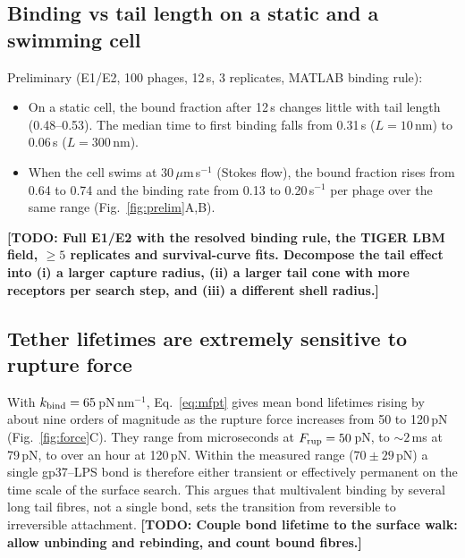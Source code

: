 \documentclass[12pt]{article}
\newcommand{\todo}[1]{{\color{blue}\textbf{[TODO: #1]}}}
\newcommand{\prelim}[1]{{\color{orange!80!black}#1}}
\begin{document}
\subsection*{Binding vs tail length on a static and a swimming cell}
\prelim{Preliminary (E1/E2, 100 phages, 12\,s, 3 replicates, MATLAB binding rule):}
\begin{itemize}\setlength\itemsep{0pt}
\item \prelim{On a static cell, the bound fraction after 12\,s changes little with tail length (0.48--0.53). The median time to first binding falls from 0.31\,s ($L=10$\,nm) to 0.06\,s ($L=300$\,nm).}
\item \prelim{When the cell swims at 30\,$\mu$m\,s$^{-1}$ (Stokes flow), the bound fraction rises from 0.64 to 0.74 and the binding rate from 0.13 to 0.20\,s$^{-1}$ per phage over the same range (Fig.~\ref{fig:prelim}A,B).}
\end{itemize}
\todo{Full E1/E2 with the resolved binding rule, the TIGER LBM field, $\ge5$ replicates and survival-curve fits. Decompose the tail effect into (i) a larger capture radius, (ii) a larger tail cone with more receptors per search step, and (iii) a different shell radius.}

\subsection*{Tether lifetimes are extremely sensitive to rupture force}
With $k_{\rm bind}=65$\,pN\,nm$^{-1}$, Eq.~\eqref{eq:mfpt} gives mean bond lifetimes rising by about nine orders of magnitude as the rupture force increases from 50 to 120\,pN (Fig.~\ref{fig:force}C). They range from microseconds at $F_{\rm rup}=50$\,pN, to $\sim\!2$\,ms at 79\,pN, to over an hour at 120\,pN. Within the measured range ($70\pm29$\,pN) a single gp37--LPS bond is therefore either transient or effectively permanent on the time scale of the surface search. This argues that multivalent binding by several long tail fibres, not a single bond, sets the transition from reversible to irreversible attachment. \todo{Couple bond lifetime to the surface walk: allow unbinding and rebinding, and count bound fibres.}

\end{document}
